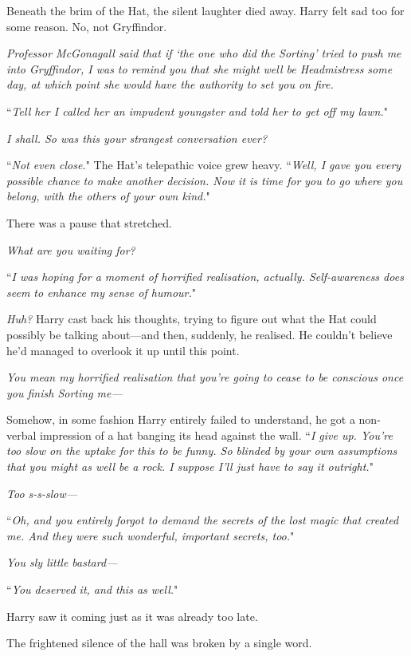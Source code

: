 Beneath the brim of the Hat, the silent laughter died away. Harry felt sad too for some reason. No, not Gryffindor.

\emph{Professor McGonagall said that if `the one who did the Sorting' tried to push me into Gryffindor, I was to remind you that she might well be Headmistress some day, at which point she would have the authority to set you on fire.}

``\emph{Tell her I called her an impudent youngster and told her to get off my lawn.}"

\emph{I shall. So was this your strangest conversation ever?}

``\emph{Not even close.}" The Hat's telepathic voice grew heavy. ``\emph{Well, I gave you every possible chance to make another decision. Now it is time for you to go where you belong, with the others of your own kind.}"

There was a pause that stretched.

\emph{What are you waiting for?}

``\emph{I was hoping for a moment of horrified realisation, actually. Self-awareness does seem to enhance my sense of humour.}"

\emph{Huh?} Harry cast back his thoughts, trying to figure out what the Hat could possibly be talking about—and then, suddenly, he realised. He couldn't believe he'd managed to overlook it up until this point.

\emph{You mean my horrified realisation that you're going to cease to be conscious once you finish Sorting me—}

Somehow, in some fashion Harry entirely failed to understand, he got a non-verbal impression of a hat banging its head against the wall. ``\emph{I give up. You're too slow on the uptake for this to be funny. So blinded by your own assumptions that you might as well be a rock. I suppose I'll just have to say it outright.}"

\emph{Too s-s-slow—}

``\emph{Oh, and you entirely forgot to demand the secrets of the lost magic that created me. And they were such wonderful, important secrets, too.}"

\emph{You sly little \emph{bastard}—}

``\emph{You deserved it, and this as well.}"

Harry saw it coming just as it was already too late.

The frightened silence of the hall was broken by a single word.

